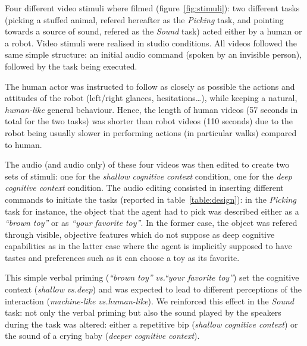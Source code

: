 \documentclass[lettersize, noapacite, twoside, HRI]{apa_HRI}
\newcommand{\vs}{\textit{vs.}\xspace}
\begin{document}
Four different video stimuli where filmed (figure~\ref{fig:stimuli}): two
different tasks (picking a stuffed animal, refered hereafter as the
\emph{Picking} task, and pointing towards a source of sound, refered as the
\emph{Sound} task) acted either by a human or a robot. Video stimuli were
realised in studio conditions. All videos followed the same simple structure: an
initial audio command (spoken by an invisible person), followed by the task
being executed.

The human actor was instructed to follow as closely as possible the actions and
attitudes of the robot (left/right glances, hesitations\ldots), while keeping a
natural, \emph{human-like} general behaviour.  Hence, the length of human videos
(57 seconds in total for the two tasks) was shorter than robot videos (110
seconds) due to the robot being usually slower in performing actions (in
particular walks) compared to human.

The audio (and audio only) of these four videos was then edited to create two
sets of stimuli: one for the \emph{shallow cognitive context} condition, one for
the \emph{deep cognitive context} condition. The audio editing consisted in
inserting different commands to initiate the tasks (reported in
table~\ref{table:design}): in the \emph{Picking} task for instance, the object
that the agent had to pick was described either as a \emph{``brown toy''} or as
\emph{``your favorite toy''}. In the former case, the object was refered through
visible, objective features which do not suppose as deep cognitive capabilities
as in the latter case where the agent is implicitly supposed to have
tastes and preferences such as it can choose a toy as its favorite.

This simple verbal priming (\emph{``brown toy''} \vs \emph{``your favorite
toy''}) set the cognitive context (\emph{shallow} \vs \emph{deep}) and was
expected to lead to different perceptions of the interaction
(\emph{machine-like} \vs \emph{human-like}). We reinforced this effect in the
\emph{Sound} task: not only the verbal priming but also the sound played by the
speakers during the task was altered: either a repetitive bip (\emph{shallow
cognitive context}) or the sound of a crying baby (\emph{deeper cognitive
context}).
\end{document}
